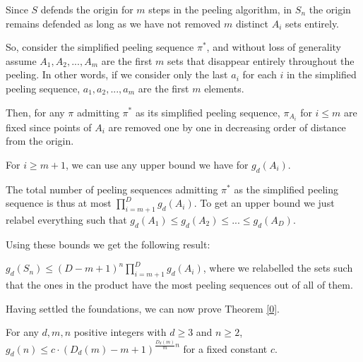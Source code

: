 \documentclass[a4paper,UKenglish,cleveref, autoref, thm-restate]{lipics-v2021}
\begin{document}
 Since $S$ defends the origin for $m$ steps in the peeling algorithm, in $S_n$ the origin remains defended as long as we have not removed $m$ distinct $A_i$ sets entirely.

 So, consider the simplified peeling sequence $\pi^*$, and without loss of generality assume $A_1, A_2, ..., A_m$ are the first $m$ sets that disappear entirely throughout the peeling. In other words, if we consider only the last $a_i$ for each $i$ in the simplified peeling sequence, $a_1, a_2, ..., a_m$ are the first $m$ elements.

 Then, for any $\pi$ admitting $\pi^*$ as its simplified peeling sequence, $\pi_{A_i}$  for $i\leq m$ are fixed since points of $A_i$ are removed one by one in decreasing order of distance from the origin.

 For $i\geq m+1$, we can use any upper bound we have for $g_d(A_i)$.

 The total number of peeling sequences admitting $\pi^*$ as the simplified peeling sequence is thus at most $\prod_{i=m+1}^{D}g_d(A_i)$. To get an upper bound we just relabel everything such that $g_d(A_1)\leq g_d(A_2) \leq ... \leq g_d(A_{D})$.

 Using these bounds we get the following result:
\begin{corollary}\label{S_n}
    $g_d(S_n)\leq (D-m+1)^n\prod_{i=m+1}^{D}g_d(A_i)$, where we relabelled the sets such that the ones in the product have the most peeling sequences out of all of them.
\end{corollary}

 Having settled the foundations, we can now prove Theorem \ref{0}.

\begin{lemma}\label{mainlemma}
For any $d,m,n$ positive integers with $d\geq 3$ and $n\geq 2$,\\ $g_d(n)\leq c\cdot(D_d(m)-m+1)^{\frac{D_d(m)}{m}n}$ for a fixed constant $c$.
\end{lemma}
\end{document}

